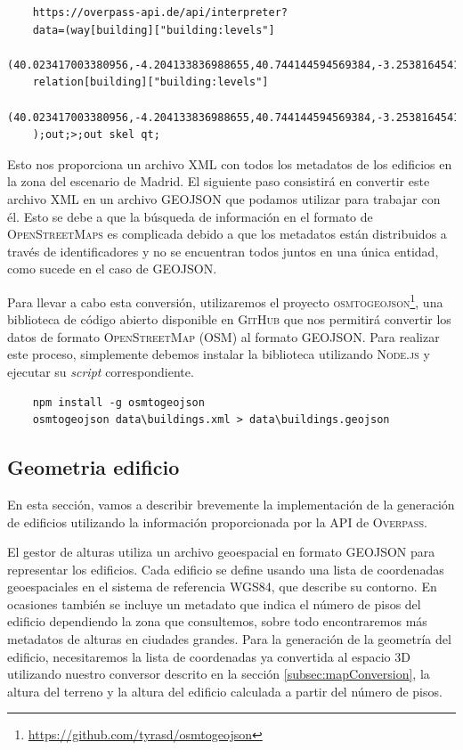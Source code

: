 \documentclass[a4paper, 11pt]{book}
\begin{document}
 \label{manual:consultaEdificios}
{\scriptsize
    \begin{verbatim}
    https://overpass-api.de/api/interpreter?
    data=(way[building]["building:levels"]
    (40.023417003380956,-4.204133836988655,40.744144594569384,-3.253816454176155);
    relation[building]["building:levels"]
    (40.023417003380956,-4.204133836988655,40.744144594569384,-3.253816454176155);
    );out;>;out skel qt;
    \end{verbatim}
}
Esto nos proporciona un archivo \textsc{XML} con todos los metadatos de los edificios en la zona del escenario de Madrid. El siguiente paso consistirá en convertir este archivo \textsc{XML} en un archivo \textsc{GEOJSON} que podamos utilizar para trabajar con él. Esto se debe a que la búsqueda de información en el formato de \textsc{OpenStreetMaps} es complicada debido a que los metadatos están distribuidos a través de identificadores y no se encuentran todos juntos en una única entidad, como sucede en el caso de \textsc{GEOJSON}.

Para llevar a cabo esta conversión, utilizaremos el proyecto \textsc{osmtogeojson}\footnote{\url{https://github.com/tyrasd/osmtogeojson}}, una biblioteca de código abierto disponible en \textsc{GitHub} que nos permitirá convertir los datos de formato \textsc{OpenStreetMap} (\textsc{OSM}) al formato \textsc{GEOJSON}. 
Para realizar este proceso, simplemente debemos instalar la biblioteca utilizando \textsc{Node.js} y ejecutar su \emph{script} correspondiente.

\label{manual:osmtogeojson}
{\scriptsize
    \begin{verbatim}
    npm install -g osmtogeojson
    osmtogeojson data\buildings.xml > data\buildings.geojson
    \end{verbatim}
}

\subsection{Geometria edificio}
\label{subsec:buildingGeometry}
En esta sección, vamos a describir brevemente la implementación de la generación de edificios utilizando la información proporcionada por la \textsc{\gls{API}} de \textsc{Overpass}.

El gestor de alturas utiliza un archivo geoespacial en formato \textsc{GEOJSON} para representar los edificios. Cada edificio se define usando una lista de coordenadas geoespaciales en el sistema de referencia \textsc{WGS84}, que describe su contorno. En ocasiones también se incluye un metadato que indica el número de pisos del edificio dependiendo la zona que consultemos, sobre todo encontraremos más metadatos de alturas en ciudades grandes. 
Para la generación de la geometría del edificio, necesitaremos la lista de coordenadas ya convertida al espacio \textsc{3D} utilizando nuestro conversor descrito en la sección \ref{subsec:mapConversion}, la altura del terreno y la altura del edificio calculada a partir del número de pisos.
\end{document}
